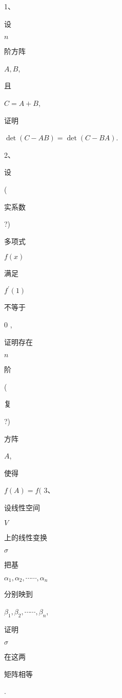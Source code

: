 \documentclass[10pt]{article}
\begin{document}
1、\begin{CJK}{UTF8}{mj}设\end{CJK} $n$ \begin{CJK}{UTF8}{mj}阶方阵\end{CJK} $A, B$, \begin{CJK}{UTF8}{mj}且\end{CJK} $C=A+B$, \begin{CJK}{UTF8}{mj}证明\end{CJK} $\operatorname{det}(C-A B)=\operatorname{det}(C-B A)$.

2、\begin{CJK}{UTF8}{mj}设\end{CJK} (\begin{CJK}{UTF8}{mj}实系数\end{CJK}?) \begin{CJK}{UTF8}{mj}多项式\end{CJK} $f(x)$ \begin{CJK}{UTF8}{mj}满足\end{CJK} $f^{\prime}(1)$ \begin{CJK}{UTF8}{mj}不等于\end{CJK} 0 , \begin{CJK}{UTF8}{mj}证明存在\end{CJK} $n$ \begin{CJK}{UTF8}{mj}阶\end{CJK} (\begin{CJK}{UTF8}{mj}复\end{CJK}?) \begin{CJK}{UTF8}{mj}方阵\end{CJK} $A$, \begin{CJK}{UTF8}{mj}使得\end{CJK} $f(A)=f($ 3、\begin{CJK}{UTF8}{mj}设线性空间\end{CJK} $V$ \begin{CJK}{UTF8}{mj}上的线性变换\end{CJK} $\sigma$ \begin{CJK}{UTF8}{mj}把基\end{CJK} $\alpha_{1}, \alpha_{2}, \cdots \cdots, \alpha_{n}$ \begin{CJK}{UTF8}{mj}分别映到\end{CJK} $\beta_{1}, \beta_{2}, \cdots \cdots, \beta_{n}$, \begin{CJK}{UTF8}{mj}证明\end{CJK} $\sigma$ \begin{CJK}{UTF8}{mj}在这两\end{CJK} \begin{CJK}{UTF8}{mj}矩阵相等\end{CJK}.
\end{document}
